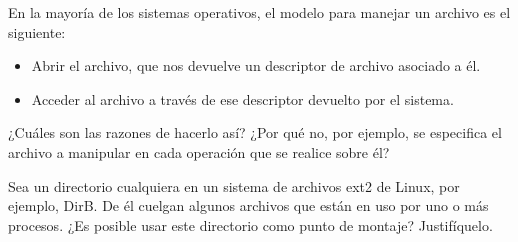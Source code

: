 \begin{ejercicio}
En la mayoría de los sistemas operativos, el modelo para manejar un archivo es el siguiente:
\begin{itemize}
    \item Abrir el archivo, que nos devuelve un descriptor de archivo asociado a él.
    \item Acceder al archivo a través de ese descriptor devuelto por el sistema.
\end{itemize}
¿Cuáles son las razones de hacerlo así? ¿Por qué no, por ejemplo, se especifica el archivo a manipular en cada operación que se realice sobre él?
\end{ejercicio}

\begin{ejercicio}
Sea un directorio cualquiera en un sistema de archivos ext2 de Linux, por ejemplo, DirB. De él cuelgan algunos archivos que están en uso por uno o más procesos. ¿Es posible usar este directorio como punto de montaje? Justifíquelo.
\end{ejercicio}